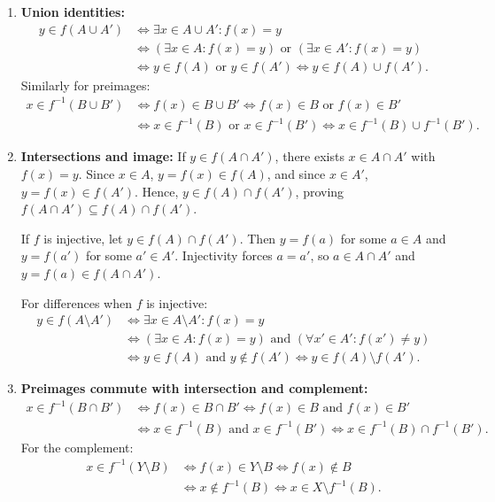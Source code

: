 \begin{exercisesolution}
\begin{enumerate}[label=\textbf{(\alph*)}]
    \item \textbf{Union identities:}
    \begin{align*}
    y \in f(A \cup A') &\iff \exists x \in A \cup A' : f(x) = y \\
    &\iff (\exists x \in A : f(x) = y) \text{ or } (\exists x \in A' : f(x) = y) \\
    &\iff y \in f(A) \text{ or } y \in f(A') \iff y \in f(A) \cup f(A').
    \end{align*}
    Similarly for preimages:
    \begin{align*}
    x \in f^{-1}(B \cup B') &\iff f(x) \in B \cup B' \iff f(x) \in B \text{ or } f(x) \in B' \\
    &\iff x \in f^{-1}(B) \text{ or } x \in f^{-1}(B') \iff x \in f^{-1}(B) \cup f^{-1}(B').
    \end{align*}

    \item \textbf{Intersections and image:} If $y \in f(A \cap A')$, there exists $x \in A \cap A'$ with $f(x) = y$. Since $x \in A$, $y = f(x) \in f(A)$, and since $x \in A'$, $y = f(x) \in f(A')$. Hence, $y \in f(A) \cap f(A')$, proving $f(A \cap A') \subseteq f(A) \cap f(A')$.
    
    If $f$ is injective, let $y \in f(A) \cap f(A')$. Then $y = f(a)$ for some $a \in A$ and $y = f(a')$ for some $a' \in A'$. Injectivity forces $a = a'$, so $a \in A \cap A'$ and $y = f(a) \in f(A \cap A')$.
    
    For differences when $f$ is injective:
    \begin{align*}
    y \in f(A \setminus A') &\iff \exists x \in A \setminus A' : f(x) = y \\
    &\iff (\exists x \in A : f(x) = y) \text{ and } (\forall x' \in A' : f(x') \ne y) \\
    &\iff y \in f(A) \text{ and } y \notin f(A') \iff y \in f(A) \setminus f(A').
    \end{align*}

    \item \textbf{Preimages commute with intersection and complement:}
    \begin{align*}
    x \in f^{-1}(B \cap B') &\iff f(x) \in B \cap B' \iff f(x) \in B \text{ and } f(x) \in B' \\
    &\iff x \in f^{-1}(B) \text{ and } x \in f^{-1}(B') \iff x \in f^{-1}(B) \cap f^{-1}(B').
    \end{align*}
    For the complement:
    \begin{align*}
    x \in f^{-1}(Y \setminus B) &\iff f(x) \in Y \setminus B \iff f(x) \notin B \\
    &\iff x \notin f^{-1}(B) \iff x \in X \setminus f^{-1}(B).
    \end{align*}
\end{enumerate}
\end{exercisesolution}
